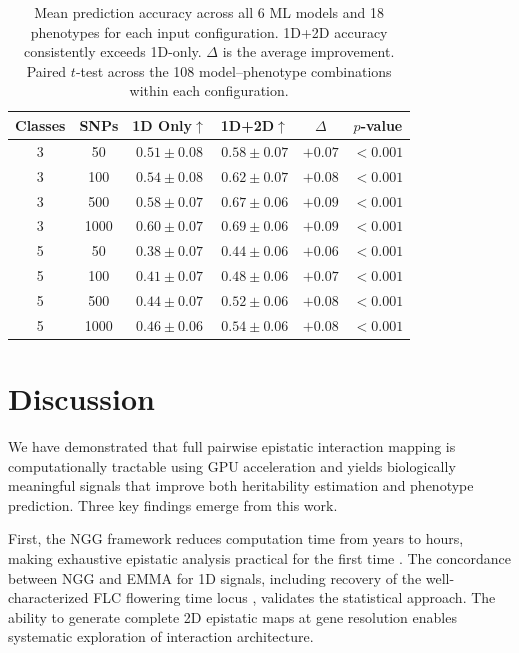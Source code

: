 \documentclass[11pt]{article}
\begin{document}
\begin{table}[H]
\centering
\caption{Mean prediction accuracy across all 6 ML models and 18 phenotypes for each input configuration. 1D+2D accuracy consistently exceeds 1D-only. $\Delta$ is the average improvement. Paired $t$-test across the 108 model--phenotype combinations within each configuration.}
\label{tab:ml_config}
\begin{tabular}{cccccc}
\toprule
\textbf{Classes} & \textbf{SNPs} & \textbf{1D Only}$\uparrow$ & \textbf{1D+2D}$\uparrow$ & \textbf{$\Delta$} & \textbf{$p$-value} \\
\midrule
3 & 50 & $0.51 \pm 0.08$ & $0.58 \pm 0.07$ & $+0.07$ & $< 0.001$ \\
3 & 100 & $0.54 \pm 0.08$ & $0.62 \pm 0.07$ & $+0.08$ & $< 0.001$ \\
3 & 500 & $0.58 \pm 0.07$ & $0.67 \pm 0.06$ & $+0.09$ & $< 0.001$ \\
3 & 1000 & $0.60 \pm 0.07$ & $0.69 \pm 0.06$ & $+0.09$ & $< 0.001$ \\
5 & 50 & $0.38 \pm 0.07$ & $0.44 \pm 0.06$ & $+0.06$ & $< 0.001$ \\
5 & 100 & $0.41 \pm 0.07$ & $0.48 \pm 0.06$ & $+0.07$ & $< 0.001$ \\
5 & 500 & $0.44 \pm 0.07$ & $0.52 \pm 0.06$ & $+0.08$ & $< 0.001$ \\
5 & 1000 & $0.46 \pm 0.06$ & $0.54 \pm 0.06$ & $+0.08$ & $< 0.001$ \\
\bottomrule
\end{tabular}
\end{table}

\section{Discussion}

We have demonstrated that full pairwise epistatic interaction mapping is computationally tractable using GPU acceleration and yields biologically meaningful signals that improve both heritability estimation and phenotype prediction. Three key findings emerge from this work.

First, the NGG framework reduces computation time from years to hours, making exhaustive epistatic analysis practical for the first time \citep{wei2014detecting, marchini2005genomewide}. The concordance between NGG and EMMA for 1D signals, including recovery of the well-characterized FLC flowering time locus \citep{michaels2008flowering}, validates the statistical approach. The ability to generate complete 2D epistatic maps at gene resolution enables systematic exploration of interaction architecture.
\end{document}
